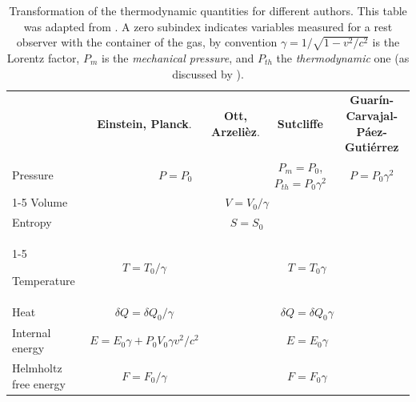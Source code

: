 \documentclass[11pt]{article}
\theoremstyle{definition}     %
\theoremstyle{definition}     %
\begin{document}
\begin{table}[h!]
   \centering
    \begin{tabular}{l|c|c|c|c}
        \hline
                    & \multirow{2}{7em}{\textbf{Einstein, Planck}.  \cite{einstein, planck} } & \multirow{2}{7em}{\textbf{Ott, Arzelièz}. \cite{Ott, arzelies1965transformation} } & \multirow{2}{*}{\textbf{Sutcliffe} \cite{Sutcliffe}}  & \multirow{2}{9em}{\textbf{Guarín-Carvajal-Páez-Gutiérrez}} \\ 
                    & & & & \\ \hline
        \multirow{2}{4em}{Pressure} & \multicolumn{2}{c|}{\multirow{2}{*}{$P=P_0$}} & \multirow{2}{5em}{$P_m=P_0$, $P_{th}=P_0\gamma^2$} & \multirow{2}{*}{$P=P_0\gamma^2$} \\	
        & \multicolumn{2}{c|}{ } & & \\ \cline{1-5}
        Volume      & \multicolumn{4}{c}{$V=V_0/\gamma$}                                  \\ 
        Entropy     & \multicolumn{4}{c}{$S=S_0$}                                         \\ \cline{1-5}

        Temperature & $T=T_0/\gamma$                  & \multicolumn{3}{c}{$T=T_0\gamma$}\\ %
        Heat            & $\delta Q =  \delta Q_0/\gamma$  & \multicolumn{3}{c}{$\delta Q = \delta Q_0\gamma$} \\ %
        Internal energy & $E=E_0\gamma+P_0V_0\gamma v^2/c^2$ & \multicolumn{3}{c}{$E=E_0\gamma$} \\ \hline
        \multirow{2}{5em}{Helmholtz free energy} & \multirow{2}{*}{$F =   F_0/\gamma$} & \multicolumn{3}{c}{\multirow{2}{*}{$F=F_0\gamma$}} \\
        & \\ \hline
    \end{tabular}
    \label{Tabla1}
    \caption{Transformation of the thermodynamic quantities for different authors. This table was adapted from \cite{Balescu}. A zero subindex indicates variables measured for a rest observer with the container of the gas, by convention $\gamma=1/\sqrt{1-v^2/c^2}$ is the Lorentz factor, $P_m$ is the \textit{mechanical pressure}, and $P_{th}$ the \textit{thermodynamic} one (as discussed by \cite{Sutcliffe}).
    }
\end{table}
\end{document}
